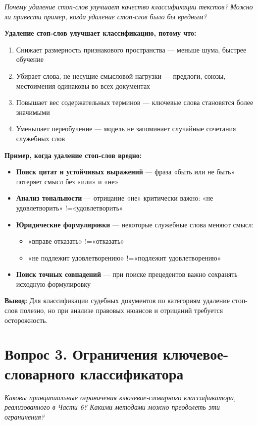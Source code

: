 \documentclass[12pt, a4paper]{report}
\begin{document}
\textit{Почему удаление стоп-слов улучшает качество классификации текстов? Можно
ли привести пример, когда удаление стоп-слов было бы вредным?}

\textbf{Удаление стоп-слов улучшает классификацию, потому что:}
\begin{enumerate}
  \item Снижает размерность признакового пространства — меньше шума, быстрее обучение
  \item Убирает слова, не несущие смысловой нагрузки — предлоги, союзы, местоимения одинаковы во всех документах
  \item Повышает вес содержательных терминов — ключевые слова становятся более значимыми
  \item Уменьшает переобучение — модель не запоминает случайные сочетания служебных слов
\end{enumerate}

\textbf{Пример, когда удаление стоп-слов вредно:}
\begin{itemize}
  \item \textbf{Поиск цитат и устойчивых выражений} — фраза «быть или не быть» потеряет смысл без «или» и «не»
  \item \textbf{Анализ тональности} — отрицание «не» критически важно: «не удовлетворить» !=«удовлетворить»
  \item \textbf{Юридические формулировки} — некоторые служебные слова меняют смысл:
    \begin{itemize}
      \item «вправе отказать» !=«отказать»
      \item «не подлежит удовлетворению» !=«подлежит удовлетворению»
    \end{itemize}
  \item \textbf{Поиск точных совпадений} — при поиске прецедентов важно сохранять исходную формулировку
\end{itemize}

\textbf{Вывод:} Для классификации судебных документов по категориям удаление стоп-слов полезно, но при анализе правовых нюансов и отрицаний требуется осторожность.

\section{Вопрос 3. Ограничения ключевое-словарного классификатора}

\textit{Каковы принципиальные ограничения ключевое-словарного классификатора,
реализованного в Части 6? Какими методами можно преодолеть эти ограничения?}
\end{document}
